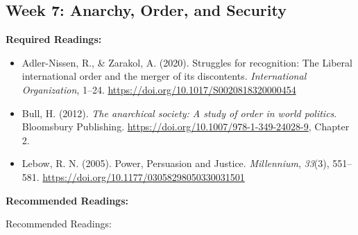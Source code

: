 \documentclass[
  letterpaper,
  DIV=11,
  numbers=noendperiod]{scrartcl}
\providecommand{\tightlist}{%
  \setlength{\itemsep}{0pt}\setlength{\parskip}{0pt}}\usepackage{longtable,booktabs,array}
\begin{document}
\hypertarget{week-7-anarchy-order-and-security}{%
\subsection*{Week 7: Anarchy, Order, and
Security}\label{week-7-anarchy-order-and-security}}

\textbf{Required Readings:}

\begin{itemize}
\tightlist
\item
  Adler-Nissen, R., \& Zarakol, A. (2020). Struggles for recognition:
  {The} {Liberal} international order and the merger of its discontents.
  \emph{International Organization}, 1--24.
  \url{https://doi.org/10.1017/S0020818320000454}
\item
  Bull, H. (2012). \emph{The anarchical society: A study of order in
  world politics}. Bloomsbury Publishing.
  \url{https://doi.org/10.1007/978-1-349-24028-9}, Chapter 2.
\item
  Lebow, R. N. (2005). Power, {Persuasion} and {Justice}.
  \emph{Millennium}, \emph{33}(3), 551--581.
  \url{https://doi.org/10.1177/03058298050330031501}
\end{itemize}

\textbf{Recommended Readings:}

Recommended Readings:
\end{document}
